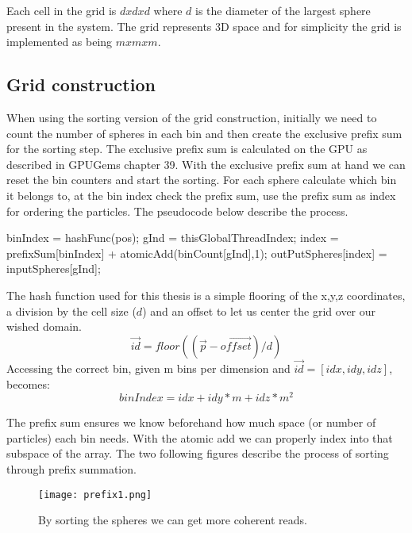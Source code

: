 Each cell in the grid is $d x d x d$ where $d$ is the diameter of the largest sphere
present in the system. The grid represents 3D space and for simplicity the grid is
implemented as being $mxmxm$.

\subsection{Grid construction}
When using the sorting version of the grid construction, initially we need to count
the number of spheres in each bin and then create the exclusive prefix sum for the sorting
step. The exclusive prefix sum is calculated on the GPU as described in GPUGems chapter 39.
With the exclusive prefix sum at hand we can reset the bin counters and start the sorting.
For each sphere calculate which bin it belongs to, at the bin index check the prefix sum,
use the prefix sum as index for ordering the particles. The pseudocode below describe
the process.

\begin{algorithm}[H]
  \begin{algorithmic}[1]
  \State binIndex = hashFunc(pos);
  \State gInd = thisGlobalThreadIndex;
  \State index = prefixSum[binIndex] + atomicAdd(binCount[gInd],1);
  \State outPutSpheres[index] = inputSpheres[gInd];
\end{algorithmic}
\end{algorithm}

The hash function used for this thesis is a simple flooring of the x,y,z coordinates, a
division by the cell size ($d$) and an offset to let us center the grid over our wished domain.
\begin{equation}
  \vec{id} = floor((\vec{p}-\vec{offset})/d)
\end{equation}
Accessing the correct bin, given m bins per dimension and $\vec{id} = [idx,idy,idz]$, becomes:
\begin{equation}
  binIndex = idx + idy*m + idz*m^2
\end{equation}

The prefix sum ensures we know beforehand how much space (or number of particles)
each bin needs. With the atomic add we can properly index into that subspace of the
array. The two following figures describe the process of sorting through prefix summation.

\begin{figure}[H]
  \centering
  \texttt{[image: prefix1.png]}
  \caption{By sorting the spheres we can get more coherent reads.}
\end{figure}

